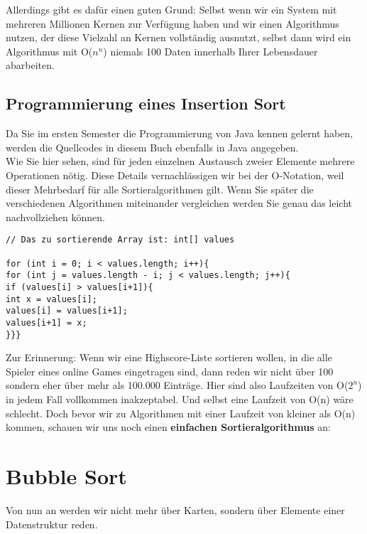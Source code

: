 Allerdings gibt es dafür einen guten Grund: Selbst wenn wir ein System mit mehreren Millionen Kernen zur Verfügung haben und wir einen Algorithmus nutzen, der diese Vielzahl an Kernen vollständig ausnutzt, selbst dann wird ein Algorithmus mit O(\(n^n\)) niemals 100 Daten innerhalb Ihrer Lebensdauer abarbeiten.\\

\subsection{Programmierung eines Insertion Sort}

Da Sie im ersten Semester die Programmierung von Java kennen gelernt haben, werden die Quellcodes in diesem Buch ebenfalls in Java angegeben.\\

Wie Sie hier sehen, sind für jeden einzelnen Austausch zweier Elemente mehrere Operationen nötig. Diese Details vernachlässigen wir bei der O-Notation, weil dieser Mehrbedarf für alle Sortieralgorithmen gilt. Wenn Sie später die verschiedenen Algorithmen miteinander vergleichen werden Sie genau das leicht nachvollziehen können.

\begin{verbatim}
// Das zu sortierende Array ist: int[] values

for (int i = 0; i < values.length; i++){
for (int j = values.length - i; j < values.length; j++){
if (values[i] > values[i+1]){
int x = values[i];
values[i] = values[i+1];
values[i+1] = x;
}}}
\end{verbatim}

Zur Erinnerung: Wenn wir eine Highscore-Liste sortieren wollen, in die alle Spieler eines online Games eingetragen sind, dann reden wir nicht über 100 sondern eher über mehr als 100.000 Einträge. Hier sind also Laufzeiten von O(\(2^n\)) in jedem Fall vollkommen inakzeptabel. Und selbst eine Laufzeit von O(n) wäre schlecht. Doch bevor wir zu Algorithmen mit einer Laufzeit von kleiner als O(n) kommen, schauen wir uns noch einen \textbf{einfachen Sortieralgorithmus} an:

\section{Bubble Sort}

Von nun an werden wir nicht mehr über Karten, sondern über Elemente einer Datenstruktur reden.\\

